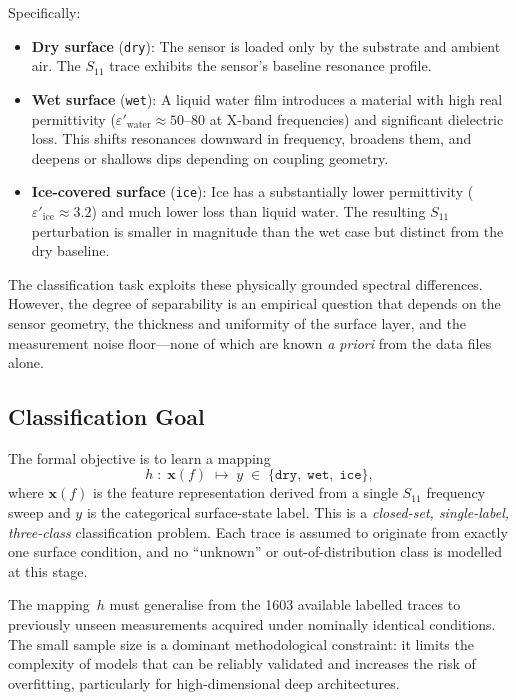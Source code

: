 Specifically:
\begin{itemize}
    \item \textbf{Dry surface} (\texttt{dry}):  The sensor is loaded
        only by the substrate and ambient air.  The $S_{11}$ trace
        exhibits the sensor's baseline resonance profile.
    \item \textbf{Wet surface} (\texttt{wet}):  A liquid water film
        introduces a material with high real permittivity
        ($\varepsilon'_{\text{water}} \approx 50$--$80$ at X-band
        frequencies) and significant dielectric loss.  This shifts
        resonances downward in frequency, broadens them, and deepens or
        shallows dips depending on coupling geometry.
    \item \textbf{Ice-covered surface} (\texttt{ice}):  Ice has a
        substantially lower permittivity ($\varepsilon'_{\text{ice}}
        \approx 3.2$) and much lower loss than liquid water.  The
        resulting $S_{11}$ perturbation is smaller in magnitude than the
        wet case but distinct from the dry baseline.
\end{itemize}

The classification task exploits these physically grounded spectral
differences.  However, the degree of separability is an empirical
question that depends on the sensor geometry, the thickness and
uniformity of the surface layer, and the measurement noise floor—none
of which are known \emph{a priori} from the data files alone.

\subsection{Classification Goal}
\label{sec:problem:goal}

The formal objective is to learn a mapping
\begin{equation}
    h \;:\; \mathbf{x}(f) \;\longmapsto\; y \;\in\; \{\texttt{dry},\;
        \texttt{wet},\;\texttt{ice}\},
    \label{eq:classifier}
\end{equation}
where $\mathbf{x}(f)$ is the feature representation derived from a
single $S_{11}$ frequency sweep and $y$ is the categorical surface-state
label.  This is a \emph{closed-set, single-label, three-class}
classification problem.  Each trace is assumed to originate from exactly
one surface condition, and no ``unknown'' or out-of-distribution class is
modelled at this stage.

The mapping~$h$ must generalise from the \num{1603} available labelled
traces to previously unseen measurements acquired under nominally
identical conditions.  The small sample size is a dominant methodological
constraint: it limits the complexity of models that can be reliably
validated and increases the risk of overfitting, particularly for
high-dimensional deep architectures.

